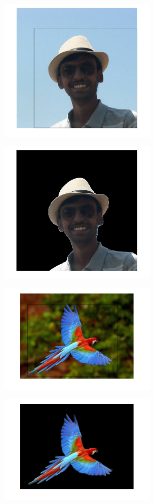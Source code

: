 \documentclass[a4paper]{article}
\begin{document}
\begin{figure}[h]
\begin{subfigure}{.5\textwidth}
  \centering
  \includegraphics[width = 3in]{varun_input_g.png}
  \label{fig:sfig2}
\end{subfigure}
\begin{subfigure}{.5\textwidth}
  \centering
  \includegraphics[width = 3in]{varun_output_g.png}
  \label{fig:sfig2}
\end{subfigure}

\begin{subfigure}{.5\textwidth}
  \centering
  \includegraphics[width = 3in]{parrot_input_g.png}
  \label{fig:sfig2}
\end{subfigure}
\begin{subfigure}{.5\textwidth}
  \centering
  \includegraphics[width = 3in]{parrot_output_g.png}
  \label{fig:sfig2}
\end{subfigure}



\end{figure}
\end{document}
